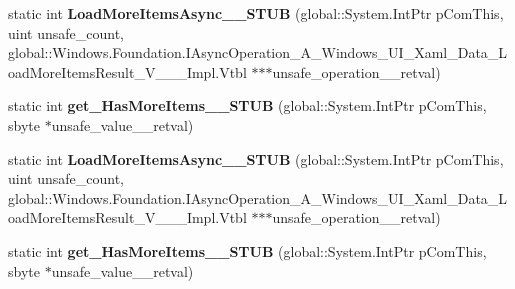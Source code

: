 \begin{DoxyCompactItemize}
\item 
\mbox{\label{struct_windows_1_1_u_i_1_1_xaml_1_1_data_1_1_i_support_incremental_loading_____impl_1_1_vtbl_a40d8957bf7163031d2d5247bc6fc8ef7}} 
static int {\bfseries Load\+More\+Items\+Async\+\_\+\+\_\+\+S\+T\+UB} (global\+::\+System.\+Int\+Ptr p\+Com\+This, uint unsafe\+\_\+count, global\+::\+Windows.\+Foundation.\+I\+Async\+Operation\+\_\+\+A\+\_\+\+Windows\+\_\+\+U\+I\+\_\+\+Xaml\+\_\+\+Data\+\_\+\+Load\+More\+Items\+Result\+\_\+\+V\+\_\+\+\_\+\+\_\+\+Impl.\+Vtbl $\ast$$\ast$$\ast$unsafe\+\_\+operation\+\_\+\+\_\+retval)
\item 
\mbox{\label{struct_windows_1_1_u_i_1_1_xaml_1_1_data_1_1_i_support_incremental_loading_____impl_1_1_vtbl_ae881f5715c03ffea730fd44d74b4735e}} 
static int {\bfseries get\+\_\+\+Has\+More\+Items\+\_\+\+\_\+\+S\+T\+UB} (global\+::\+System.\+Int\+Ptr p\+Com\+This, sbyte $\ast$unsafe\+\_\+value\+\_\+\+\_\+retval)
\item 
\mbox{\label{struct_windows_1_1_u_i_1_1_xaml_1_1_data_1_1_i_support_incremental_loading_____impl_1_1_vtbl_a40d8957bf7163031d2d5247bc6fc8ef7}} 
static int {\bfseries Load\+More\+Items\+Async\+\_\+\+\_\+\+S\+T\+UB} (global\+::\+System.\+Int\+Ptr p\+Com\+This, uint unsafe\+\_\+count, global\+::\+Windows.\+Foundation.\+I\+Async\+Operation\+\_\+\+A\+\_\+\+Windows\+\_\+\+U\+I\+\_\+\+Xaml\+\_\+\+Data\+\_\+\+Load\+More\+Items\+Result\+\_\+\+V\+\_\+\+\_\+\+\_\+\+Impl.\+Vtbl $\ast$$\ast$$\ast$unsafe\+\_\+operation\+\_\+\+\_\+retval)
\item 
\mbox{\label{struct_windows_1_1_u_i_1_1_xaml_1_1_data_1_1_i_support_incremental_loading_____impl_1_1_vtbl_ae881f5715c03ffea730fd44d74b4735e}} 
static int {\bfseries get\+\_\+\+Has\+More\+Items\+\_\+\+\_\+\+S\+T\+UB} (global\+::\+System.\+Int\+Ptr p\+Com\+This, sbyte $\ast$unsafe\+\_\+value\+\_\+\+\_\+retval)
\item 
\mbox{\label{struct_windows_1_1_u_i_1_1_xaml_1_1_data_1_1_i_support_incremental_loading_____impl_1_1_vtbl_a40d8957bf7163031d2d5247bc6fc8ef7}} 

\end{DoxyCompactItemize}
